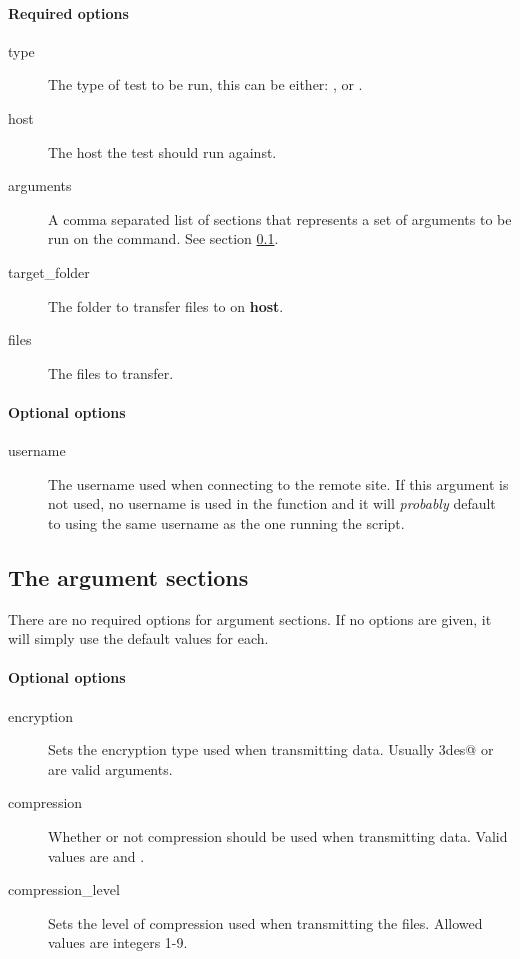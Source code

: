 \paragraph*{Required options}

\begin{description}
    \item[type] The type of test to be run, this can be either: \verb@scp@,
        \verb@sftp@ or \verb@rsync@.
    \item[host] The host the test should run against.
    \item[arguments] A comma separated list of sections that represents a set
        of arguments to be run on the command. See section
        \ref{sec:argument_sec}.
    \item[target\_folder] The folder to transfer files to on \textbf{host}.
    \item[files] The files to transfer.
\end{description}

\paragraph*{Optional options}

\begin{description}
    \item[username] The username used when connecting to the remote site. If
        this argument is not used, no username is used in the function and it
        will \textit{probably} default to using the same username as the one
        running the script.
\end{description}


\subsection{The argument sections}
\label{sec:argument_sec}

There are no required options for argument sections. If no options are given,
it will simply use the default values for each.

\paragraph*{Optional options}

\begin{description}
    \item[encryption]   Sets the encryption type used when transmitting data.
        Usually \verb@3des@ or \verb@blowfish@ are valid arguments.
    \item[compression]  Whether or not compression should be used when
        transmitting data. Valid values are \verb@yes@ and \verb@no@.
    \item[compression\_level]   Sets the level of compression used when
        transmitting the files. Allowed values are integers 1-9.
\end{description}

